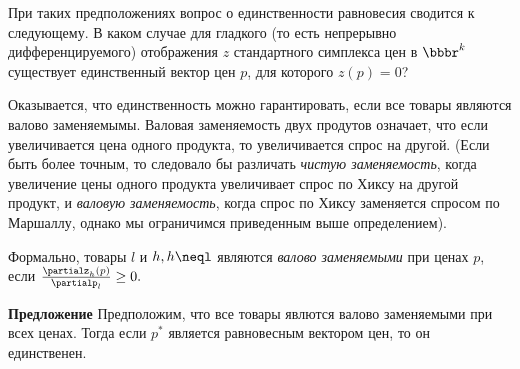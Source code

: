 При таких предположениях вопрос о единственности равновесия сводится
к следующему. В каком случае для гладкого (то есть непрерывно
дифференцируемого) отображения $z$ стандартного симплекса цен в
$\bbbr^k$ существует единственный вектор цен $p$, для которого
$z(p)=0$?

Оказывается, что единственность можно гарантировать, если все товары
являются валово заменяемымы. Валовая заменяемость двух продутов
означает, что если увеличивается цена одного продукта, то
увеличивается спрос на другой. (Если быть более точным, то следовало
бы различать \emph{чистую заменяемость}, когда увеличение цены
одного продукта увеличивает спрос по Хиксу на другой продукт, и
\emph{валовую заменяемость}, когда спрос по Хиксу заменяется спросом
по Маршаллу, однако мы ограничимся приведенным выше определением).

Формально, товары $l$ и $h, h\neql$ являются \emph{валово
заменяемыми} при ценах $p$, если
$\frac{\partialz_h(p)}{\partialp_l}\geq0.$

\textbf{Предложение} Предположим, что все товары явлются валово
заменяемыми при всех ценах. Тогда если $p^*$ является равновесным
вектором цен, то он единственен.

